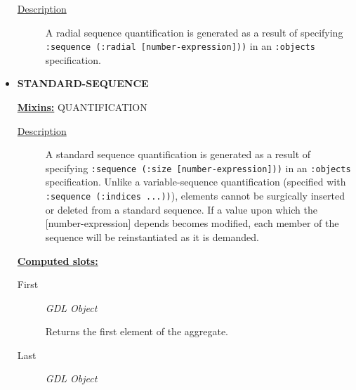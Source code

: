 \documentclass [11pt]{book}
\begin{document}
\begin{itemize}
\begin{description}

\item [
\underline{Description}]


A radial sequence quantification is generated as a result of specifying 
\texttt{:sequence (:radial [number-expression]))} in an \texttt{:objects} specification.



\end{description}









\item {}
\label{prim:standard-sequence}
\textbf{STANDARD-SEQUENCE}


\textbf{
\underline{Mixins:}} QUANTIFICATION





\begin{description}

\item [
\underline{Description}]


A standard sequence quantification is generated as a result of specifying 
\texttt{:sequence (:size [number-expression]))} in an \texttt{:objects} specification. Unlike a variable-sequence 
quantification (specified with \texttt{:sequence (:indices ...))}), elements cannot be surgically inserted or 
deleted from a standard sequence. If a value upon which the [number-expression] depends becomes modified,
each member of the sequence will be reinstantiated as it is demanded.



\end{description}








\textbf{
\underline{Computed slots:}}

\begin{description}

\item [First]
\emph{GDL Object}

 Returns the first element of the aggregate.




\item [Last]
\emph{GDL Object}


\end{description}
\end{itemize}
\end{document}
